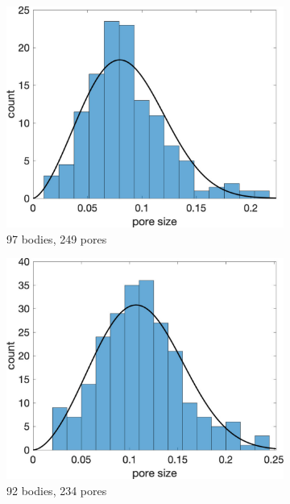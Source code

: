\documentclass{jfm}
\begin{document}
\begin{figure}
\begin{subfigure}[b]{0.33\textwidth}
\includegraphics*[width =\linewidth]{./figs/hist100b_112}
\caption{97 bodies, 249 pores}
\end{subfigure}
\begin{subfigure}[b]{0.33\textwidth}
\includegraphics*[width =\linewidth]{./figs/hist100b_164}
\caption{92 bodies, 234 pores}
\end{subfigure}%
\begin{subfigure}[b]{0.33\textwidth}

\end{subfigure}
\end{figure}
\end{document}

